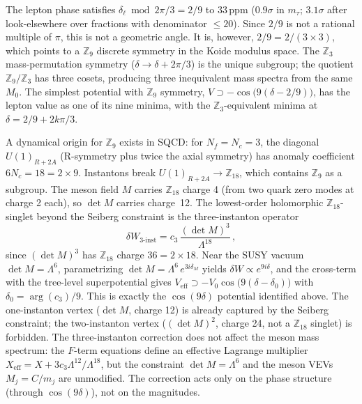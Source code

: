 \documentclass[12pt,a4paper]{article}
\begin{document}
The lepton phase satisfies $\delta_\ell \bmod 2\pi/3 = 2/9$ to
$33\,\text{ppm}$ ($0.9\sigma$ in $m_\tau$; $3.1\sigma$ after
look-elsewhere over fractions with denominator $\leq 20$). Since $2/9$
is not a rational multiple of $\pi$, this is not a geometric angle.
It is, however, $2/9 = 2/(3\times 3)$, which points to a $\mathbb{Z}_9$
discrete symmetry in the Koide modulus space. The $\mathbb{Z}_3$
mass-permutation symmetry ($\delta \to \delta + 2\pi/3$) is the
unique subgroup; the quotient $\mathbb{Z}_9/\mathbb{Z}_3$ has three
cosets, producing three inequivalent mass spectra from the same $M_0$.
The simplest potential with $\mathbb{Z}_9$ symmetry,
$V \supset -\cos\bigl(9(\delta - 2/9)\bigr)$, has the lepton value
as one of its nine minima, with the $\mathbb{Z}_3$-equivalent minima
at $\delta = 2/9 + 2k\pi/3$.

A dynamical origin for $\mathbb{Z}_9$ exists in SQCD: for $N_f = N_c = 3$,
the diagonal $U(1)_{R+2A}$ (R-symmetry plus twice the axial symmetry)
has anomaly coefficient $6N_c = 18 = 2 \times 9$. Instantons break
$U(1)_{R+2A} \to \mathbb{Z}_{18}$, which contains $\mathbb{Z}_9$
as a subgroup. The meson field $M$ carries $\mathbb{Z}_{18}$ charge 4
(from two quark zero modes at charge 2 each), so $\det M$ carries
charge~12.  The lowest-order holomorphic $\mathbb{Z}_{18}$-singlet
beyond the Seiberg constraint is the three-instanton operator
\begin{equation}
  \delta W_{3\text{-inst}}
    = c_3\,\frac{(\det M)^3}{\Lambda^{18}}\,,
\end{equation}
since $(\det M)^3$ has $\mathbb{Z}_{18}$ charge $36 = 2\times 18$.
Near the SUSY vacuum $\det M = \Lambda^6$, parametrizing
$\det M = \Lambda^6\,e^{3i\delta_M}$ yields
$\delta W \propto e^{9i\delta}$, and the cross-term with the
tree-level superpotential gives
$V_{\text{eff}} \supset -V_0\cos\bigl(9(\delta - \delta_0)\bigr)$
with $\delta_0 = \arg(c_3)/9$.
This is exactly the $\cos(9\delta)$ potential identified above.
The one-instanton vertex ($\det M$, charge 12) is already captured
by the Seiberg constraint; the two-instanton vertex ($(\det M)^2$,
charge 24, not a $\mathbb{Z}_{18}$ singlet) is forbidden.
The three-instanton correction does not affect the meson mass
spectrum: the $F$-term equations define an effective Lagrange
multiplier $X_{\text{eff}} = X + 3c_3\Lambda^{12}/\Lambda^{18}$,
but the constraint $\det M = \Lambda^6$ and the meson VEVs
$M_j = C/m_j$ are unmodified. The correction acts only on the
phase structure (through $\cos(9\delta)$), not on the magnitudes.
\end{document}
